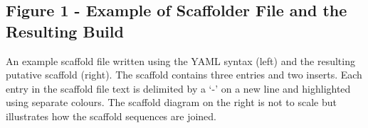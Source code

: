 \documentclass[10pt]{bmc_article}
\newenvironment{bmcformat}{\begin{raggedright}\baselineskip20pt\sloppy\setboolean{publ}{false}}{\end{raggedright}\baselineskip20pt\sloppy}
\begin{document}
\begin{bmcformat}
\subsection*{Figure 1 - Example of Scaffolder File and the Resulting Build}

An example scaffold file written using the YAML syntax \cite{yaml} (left) and
the resulting putative scaffold (right). The scaffold contains three entries
and two inserts. Each entry in the scaffold file text is delimited by a `-' on
a new line and highlighted using separate colours. The scaffold diagram on the
right is not to scale but illustrates how the scaffold sequences are joined.
\pb

\end{bmcformat}
\end{document}
